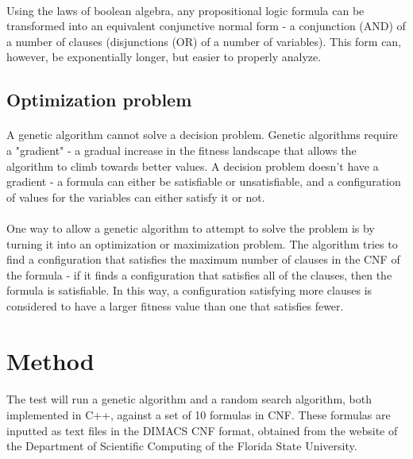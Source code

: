 \documentclass{article}
\begin{document}
\paragraph{}
Using the laws of boolean algebra, any propositional logic formula can be transformed into an equivalent conjunctive normal form - a conjunction (AND) of a number of clauses (disjunctions (OR) of a number of variables). This form can, however, be exponentially longer, but easier to properly analyze.

\subsection{Optimization problem}
\paragraph{}
A genetic algorithm cannot solve a decision problem. Genetic algorithms require a "gradient" - a gradual increase in the fitness landscape that allows the algorithm to climb towards better values. A decision problem doesn't have a gradient - a formula can either be satisfiable or unsatisfiable, and a configuration of values for the variables can either satisfy it or not.

\paragraph{}
One way to allow a genetic algorithm to attempt to solve the problem is by turning it into an optimization or maximization problem. The algorithm tries to find a configuration that satisfies the maximum number of clauses in the CNF of the formula - if it finds a configuration that satisfies all of the clauses, then the formula is satisfiable. In this way, a configuration satisfying more clauses is considered to have a larger fitness value than one that satisfies fewer.

\section{Method}
\paragraph{}
The test will run a genetic algorithm and a random search algorithm, both implemented in C++, against a set of 10 formulas in CNF. These formulas are inputted as text files in the DIMACS CNF format, obtained from the website of the Department of Scientific Computing of the Florida State University\cite{burkardt_2008}. 
\end{document}
